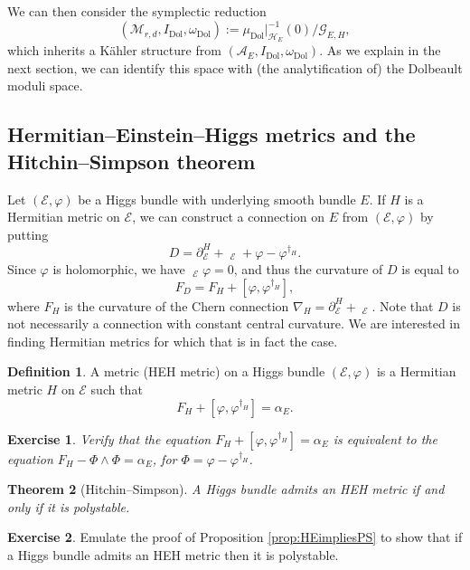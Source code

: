 \documentclass[12pt,a4paper]{amsbook}
\newtheorem{thm}{Theorem}[chapter]
\theoremstyle{remark} \newtheorem{rmk}[thm]{Remark}
\theoremstyle{definition} \newtheorem{defn}[thm]{Definition}
\theoremstyle{definition} \newtheorem{ex}[thm]{Example}
\theoremstyle{definition} \newtheorem{ej}{Exercise}
\let\emph\relax
\newcommand{\cA}{\mathcal A}
\newcommand{\cH}{\mathcal H}
\newcommand{\cG}{\mathcal G}
\newcommand{\cM}{\mathcal M}
\newcommand{\sE}{\mathscr E}
\newcommand{\Dol}{\mathrm{Dol}}
\DeclareMathOperator{\delbar}{\bar{\partial}}
\begin{document}
We can then consider the symplectic reduction \[(\cM_{r,d},I_{\Dol},\omega_{\Dol}):= \mu_{\Dol}|_{\cH_E}^{-1}(0)/\cG_{E,H},\] which inherits a Kähler structure from $(\cA_E,I_{\Dol},\omega_{\Dol})$. As we explain in the next section, we can identify this space with (the analytification of) the Dolbeault moduli space.

\subsection*{Hermitian--Einstein--Higgs metrics and the Hitchin--Simpson theorem}
Let $(\sE,\varphi)$ be a Higgs bundle with underlying smooth bundle $E$. If $H$ is a Hermitian metric on $\sE$, we can construct a connection on $E$ from $(\sE,\varphi)$ by putting
\begin{equation*}
D = \partial_{\sE}^{H} + \delbar_{\sE} + \varphi - \varphi^{\dagger_H}.
\end{equation*}
Since $\varphi$ is holomorphic, we have $\delbar_{\sE} \varphi = 0$, and thus the curvature of $D$ is equal to
\begin{equation*}
F_D = F_H + [\varphi,\varphi^{\dagger_H}],
\end{equation*}
where $F_H$ is the curvature of the Chern connection $\nabla_H = \partial_{\sE}^{H} + \delbar_{\sE}$. Note that $D$ is not necessarily a connection with constant central curvature. We are interested in finding Hermitian metrics for which that is in fact the case.

\begin{defn}
A \emph{Hermitian-Einstein-Higgs} metric (HEH metric) on a Higgs bundle $(\sE,\varphi)$ is a Hermitian metric $H$ on $\sE$ such that
\begin{equation*}
F_H + [\varphi,\varphi^{\dagger_H}] = \alpha_E.
\end{equation*}
\end{defn}

\begin{ej}
\textit{Verify that the equation $F_H + [\varphi,\varphi^{\dagger_H}] = \alpha_E$ is equivalent to the equation $F_H - \Phi \wedge \Phi = \alpha_E$, for $\Phi=\varphi - \varphi^{\dagger_H}$.}
\end{ej}

\begin{thm}[Hitchin--Simpson]
A Higgs bundle admits an HEH metric if and only if it is polystable.
\end{thm}

\begin{ej}
Emulate the proof of Proposition \ref{prop:HEimpliesPS} to show that if a Higgs bundle admits an HEH metric then it is polystable.
\end{ej}
\end{document}

